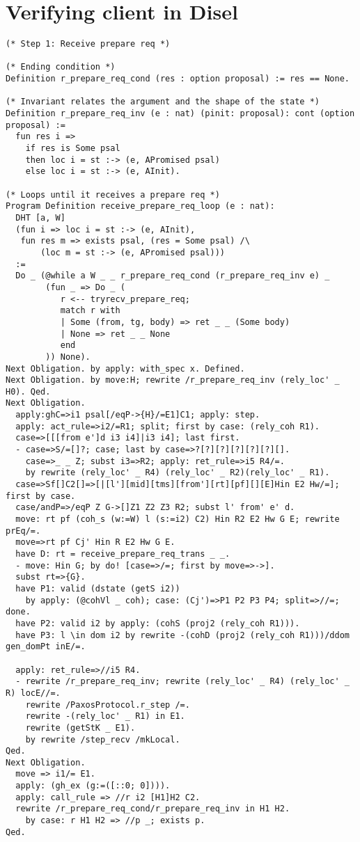 \section{Verifying client in Disel}
\begin{lstlisting}
(* Step 1: Receive prepare req *)

(* Ending condition *)
Definition r_prepare_req_cond (res : option proposal) := res == None.

(* Invariant relates the argument and the shape of the state *)
Definition r_prepare_req_inv (e : nat) (pinit: proposal): cont (option proposal) :=
  fun res i =>
    if res is Some psal
    then loc i = st :-> (e, APromised psal)
    else loc i = st :-> (e, AInit).

(* Loops until it receives a prepare req *)
Program Definition receive_prepare_req_loop (e : nat):
  DHT [a, W]
  (fun i => loc i = st :-> (e, AInit),
   fun res m => exists psal, (res = Some psal) /\
       (loc m = st :-> (e, APromised psal)))
  :=
  Do _ (@while a W _ _ r_prepare_req_cond (r_prepare_req_inv e) _
        (fun _ => Do _ (
           r <-- tryrecv_prepare_req;
           match r with
           | Some (from, tg, body) => ret _ _ (Some body)
           | None => ret _ _ None
           end
        )) None).
Next Obligation. by apply: with_spec x. Defined.
Next Obligation. by move:H; rewrite /r_prepare_req_inv (rely_loc' _ H0). Qed.
Next Obligation.
  apply:ghC=>i1 psal[/eqP->{H}/=E1]C1; apply: step.
  apply: act_rule=>i2/=R1; split; first by case: (rely_coh R1).
  case=>[[[from e']d i3 i4]|i3 i4]; last first.
  - case=>S/=[]?; case; last by case=>?[?][?][?][?][?][].
    case=>_ _ Z; subst i3=>R2; apply: ret_rule=>i5 R4/=.
    by rewrite (rely_loc' _ R4) (rely_loc' _ R2)(rely_loc' _ R1).
  case=>Sf[]C2[]=>[|[l'][mid][tms][from'][rt][pf][][E]Hin E2 Hw/=]; first by case.
  case/andP=>/eqP Z G->[]Z1 Z2 Z3 R2; subst l' from' e' d.
  move: rt pf (coh_s (w:=W) l (s:=i2) C2) Hin R2 E2 Hw G E; rewrite prEq/=.
  move=>rt pf Cj' Hin R E2 Hw G E.
  have D: rt = receive_prepare_req_trans _ _.
  - move: Hin G; by do! [case=>/=; first by move=>->].
  subst rt=>{G}.
  have P1: valid (dstate (getS i2))
    by apply: (@cohVl _ coh); case: (Cj')=>P1 P2 P3 P4; split=>//=; done.
  have P2: valid i2 by apply: (cohS (proj2 (rely_coh R1))).
  have P3: l \in dom i2 by rewrite -(cohD (proj2 (rely_coh R1)))/ddom gen_domPt inE/=.

  apply: ret_rule=>//i5 R4.
  - rewrite /r_prepare_req_inv; rewrite (rely_loc' _ R4) (rely_loc' _ R) locE//=.
    rewrite /PaxosProtocol.r_step /=.
    rewrite -(rely_loc' _ R1) in E1.
    rewrite (getStK _ E1).
    by rewrite /step_recv /mkLocal.
Qed.
Next Obligation.
  move => i1/= E1.
  apply: (gh_ex (g:=([::0; 0]))).
  apply: call_rule => //r i2 [H1]H2 C2.
  rewrite /r_prepare_req_cond/r_prepare_req_inv in H1 H2.
    by case: r H1 H2 => //p _; exists p.
Qed.
\end{lstlisting}
